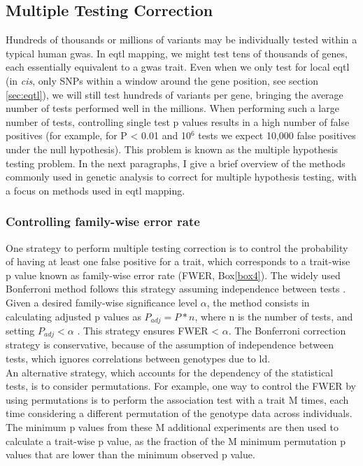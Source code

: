 \subsection{Multiple Testing Correction}

Hundreds of thousands or millions of variants may be individually tested within a typical human \gls{gwas}. 
In e\gls{qtl} mapping, we might test tens of thousands of genes, each essentially equivalent to a \gls{gwas} trait. 
Even when we only test for local e\gls{qtl} (in \textit{cis}, only SNPs within a window around the gene position, see section \ref{sec:eqtl}), we will still test hundreds of variants per gene, bringing the average number of tests performed well in the millions.  
When performing such a large number of tests, controlling single test p values results in a high number of false positives (for example, for P < 0.01 and 10$^6$ tests we expect 10,000 false positives under the null hypothesis). 
This problem is known as the multiple hypothesis testing problem. 
In the next paragraphs, I give a brief overview of the methods commonly used in genetic analysis to correct for multiple hypothesis testing, with a focus on methods used in e\gls{qtl} mapping.

\subsubsection{Controlling family-wise error rate} 

One strategy to perform multiple testing correction is to control the probability of having at least one false positive for a trait, which corresponds to a trait-wise p value known as family-wise error rate (FWER, Box\ref{box4}).
The widely used Bonferroni method follows this strategy assuming independence between tests \cite{laird2010fundamentals}. 
Given a desired family-wise significance level $\alpha$, the method consists in calculating adjusted p values as $P_{adj} = P*n $, where n is the number of tests, and setting $P_{adj} < \alpha$ . 
This strategy ensures FWER < $\alpha$. 
The Bonferroni correction strategy is conservative, because of the assumption of independence between tests, which ignores correlations between genotypes due to \gls{ld}.\\

An alternative strategy, which accounts for the dependency of the statistical tests, is to consider permutations. 
For example, one way to control the FWER by using permutations is to perform the association test with a trait M times, each time considering a different permutation of the genotype data across individuals.
The minimum p values from these M additional experiments are then used to calculate a trait-wise p value, as the fraction of the M minimum permutation p values that are lower than the minimum observed p value. 

